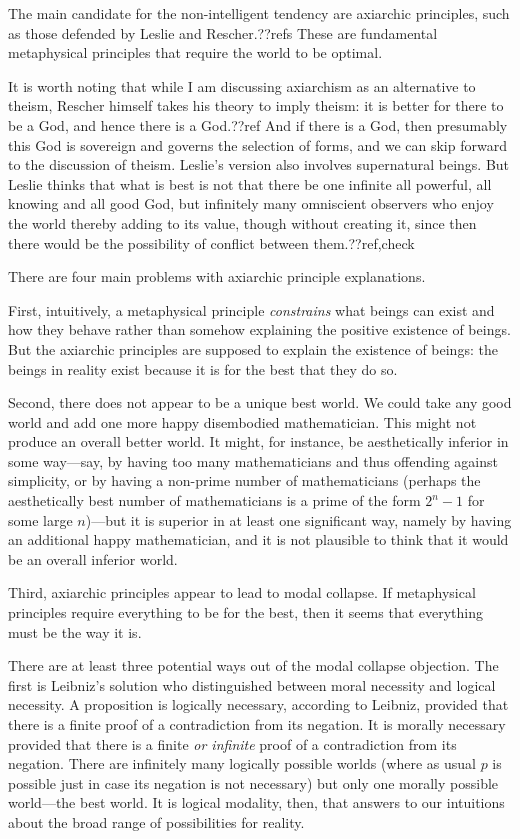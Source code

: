 The main candidate for the non-intelligent tendency are axiarchic principles, such as those defended by Leslie and Rescher.??refs
These are fundamental metaphysical principles that require the world to be optimal. 

It is worth noting that while I am discussing axiarchism as an alternative to theism, Rescher himself takes his theory to
imply theism: it is better for there to be a God, and hence there is a God.??ref And if there is a God, then presumably this God
is sovereign and governs the selection of forms, and we can skip forward to the discussion of theism. Leslie's version also
involves supernatural beings. But Leslie thinks that what is best is not that there be one infinite all powerful, all knowing
and all good God, but infinitely many omniscient observers who enjoy the world thereby adding to its value, though without
creating it, since then there would be the possibility of conflict between them.??ref,check

There are four main problems with axiarchic principle explanations.

First, intuitively, a metaphysical principle \textit{constrains} what beings can exist and how they behave rather than somehow 
explaining the positive existence of beings. But the axiarchic principles are supposed to explain the existence of beings: the beings
in reality exist because it is for the best that they do so. 

Second, there does not appear to be a unique best world. We could take any good world and add one more happy disembodied mathematician.
This might not produce an overall better world. It might, for instance, be aesthetically inferior in some way---say, by having too many
mathematicians and thus offending against simplicity, or by having a non-prime number of mathematicians (perhaps the aesthetically best 
number of mathematicians is a prime of the form $2^n-1$ for some large $n$)---but it is superior in at least one significant way, namely 
by having an additional happy mathematician, and it is not plausible to think that it would be an overall inferior world.

Third, axiarchic principles appear to lead to modal collapse. If metaphysical principles require everything to be 
for the best, then it seems that everything must be the way it is. 

There are at least three potential ways out of the modal collapse objection. The first is Leibniz's solution who distinguished between 
moral necessity and logical necessity. A proposition is logically necessary, according to Leibniz, provided that there is a finite
proof of a contradiction from its negation. It is morally necessary provided that there is a finite \textit{or infinite} proof of a 
contradiction from its negation. There are infinitely many logically possible worlds (where as usual $p$ is possible just in case its negation
is not necessary) but only one morally possible world---the best world. It is logical modality, then, that answers to our intuitions about
the broad range of possibilities for reality.

